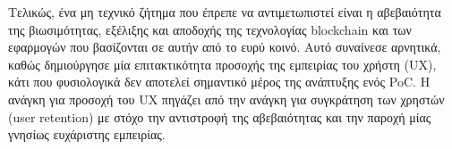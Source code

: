 Τελικώς, ένα μη τεχνικό ζήτημα που έπρεπε να αντιμετωπιστεί είναι η αβεβαιότητα της βιωσιμότητας, εξέλιξης και αποδοχής της τεχνολογίας blockchain και των εφαρμογών που βασίζονται σε αυτήν από το ευρύ κοινό. Αυτό συναίνεσε αρνητικά, καθώς δημιούργησε μία επιτακτικότητα προσοχής της εμπειρίας του χρήστη (UX), κάτι που φυσιολογικά δεν αποτελεί σημαντικό μέρος της ανάπτυξης ενός PoC. Η ανάγκη για προσοχή του UX πηγάζει από την ανάγκη για συγκράτηση των χρηστών (user retention) με στόχο την αντιστροφή της αβεβαιότητας και την παροχή μίας γνησίως ευχάριστης εμπειρίας.
